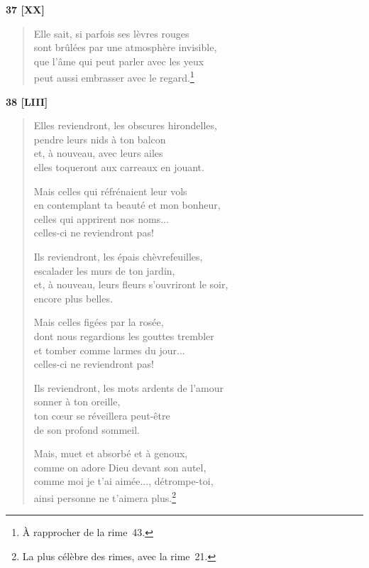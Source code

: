 
\begin{center}
  \textbf{37 [XX]}
\end{center}

\vspace*{-15pt}

\begin{verse}
  Elle sait, si parfois ses lèvres rouges \\
  sont brûlées par une atmosphère invisible, \\
  que l'âme qui peut parler avec les yeux \\
  peut aussi embrasser avec le regard.\footnote{À rapprocher de la rime~43.}
\end{verse}


\begin{center}
  \textbf{38 [LIII]}
\end{center}

\vspace*{-15pt}

\begin{verse}
  Elles reviendront, les obscures hirondelles, \\
  pendre leurs nids à ton balcon \\
  et, à nouveau, avec leurs ailes \\
  elles toqueront aux carreaux en jouant.

  Mais celles qui réfrénaient leur vols \\
  en contemplant ta beauté et mon bonheur, \\
  celles qui apprirent nos noms... \\
  celles-ci ne reviendront pas!

  Ils reviendront, les épais chèvrefeuilles, \\
  escalader les murs de ton jardin, \\
  et, à nouveau, leurs fleurs s'ouvriront le soir, \\
  encore plus belles.

  Mais celles figées par la rosée, \\
  dont nous regardions les gouttes trembler \\
  et tomber comme larmes du jour... \\
  celles-ci ne reviendront pas!

  Ils reviendront, les mots ardents de l'amour \\
  sonner à ton oreille, \\
  ton cœur se réveillera peut-être \\
  de son profond sommeil.

  Mais, muet et absorbé et à genoux, \\
  comme on adore Dieu devant son autel, \\
  comme moi je t'ai aimée..., détrompe-toi, \\
  ainsi personne ne t'aimera plus.\footnote{La plus célèbre des rimes,
  avec la rime~21.}
\end{verse}

